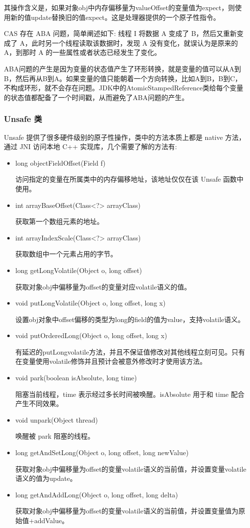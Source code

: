 其操作含义是，如果对象obj中内存偏移量为valueOffset的变量值为expect，则使用新的值update替换旧的值expect。这是处理器提供的一个原子性指令。

CAS 存在 ABA 问题，简单阐述如下: 线程 I 将数据 A 变成了 B，然后又重新变成了 A，此时另一个线程读取该数据时，发现 A 没有变化，就误认为是原来的 A，到那时 A 的一些属性或者状态已经发生了变化。

ABA问题的产生是因为变量的状态值产生了环形转换，就是变量的值可以从A到B，然后再从B到A。如果变量的值只能朝着一个方向转换，比如A到B，B到C，不构成环形，就不会存在问题。JDK中的AtomicStampedReference类给每个变量的状态值都配备了一个时间戳，从而避免了ABA问题的产生。

\subsubsection*{Unsafe 类}

Unsafe 提供了很多硬件级别的原子性操作，类中的方法本质上都是 native 方法，通过 JNI 访问本地 C++ 实现库，几个需要了解的方法有:
\begin{itemize}
    \item long objectFieldOffset(Field f)
    
访问指定的变量在所属类中的内存偏移地址，该地址仅仅在该 Unsafe 函数中使用。
    \item int arrayBaseOffset(Class<?> arrayClass)
    
获取第一个数组元素的地址。
    \item int arrayIndexScale(Class<?> arrayClass)
    
获取数组中一个元素占用的字节。
    \item long getLongVolatile(Object o, long offset)
    
获取对象obj中偏移量为offset的变量对应volatile语义的值。
    \item void putLongVolatile(Object o, long offset, long x)
    
设置obj对象中offset偏移的类型为long的field的值为value，支持volatile语义。
    \item void putOrderedLong(Object o, long offset, long x)
    
有延迟的putLongvolatile方法，并且不保证值修改对其他线程立刻可见。只有在变量使用volatile修饰并且预计会被意外修改时才使用该方法。
    \item void park(boolean isAbsolute, long time)
    
阻塞当前线程，time 表示经过多长时间被唤醒。isAbsolute 用于和 time 配合产生不同效果。
    \item void unpark(Object thread)
    
唤醒被 park 阻塞的线程。
    \item long getAndSetLong(Object o, long offset, long newValue)
    
获取对象obj中偏移量为offset的变量volatile语义的当前值，并设置变量volatile语义的值为update。
    \item long getAndAddLong(Object o, long offset, long delta)
    
获取对象obj中偏移量为offset的变量volatile语义的当前值，并设置变量值为原始值+addValue。
\end{itemize}

